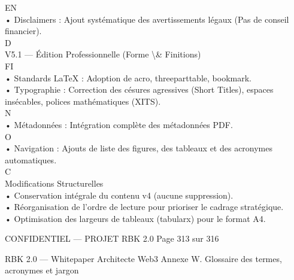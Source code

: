 \documentclass[12pt,landscape,a4paper]{article}
\newenvironment{confidential}
{\begin{tcolorbox}[
    colback=rbkred!5!white,
    colframe=rbkred!75!black,
    title=CONFIDENTIEL,
    fonttitle=\bfseries\color{white},
    coltitle=rbkred!75!black,
    breakable,
    enhanced,
    frame hidden,
    borderline west={2pt}{0pt}{rbkred!75!black}
]}
{\end{tcolorbox}}
\begin{document}
\vspace{0.5em}
\vspace{0.5em}
\vspace{0.5em}
EN\\
• Disclaimers : Ajout systématique des avertissements légaux (Pas de conseil financier).\\
\vspace{0.5em}
\vspace{0.5em}
\vspace{0.5em}
\vspace{0.5em}
D\\
V5.1 — Édition Professionnelle (Forme \textbackslash{}& Finitions)\\
\vspace{0.5em}
\vspace{0.5em}
FI\\
• Standards LaTeX : Adoption de acro, threeparttable, bookmark.\\
• Typographie : Correction des césures agressives (Short Titles), espaces insécables, polices mathématiques (XITS).\\
N\\
• Métadonnées : Intégration complète des métadonnées PDF.\\
O\\
• Navigation : Ajouts de liste des figures, des tableaux et des acronymes automatiques.\\
C\\
\vspace{0.5em}
\vspace{0.5em}
Modifications Structurelles\\
• Conservation intégrale du contenu v4 (aucune suppression).\\
• Réorganisation de l’ordre de lecture pour prioriser le cadrage stratégique.\\
• Optimisation des largeurs de tableaux (tabularx) pour le format A4.\\
\vspace{0.5em}
\vspace{0.5em}
\vspace{0.5em}
\vspace{0.5em}
\begin{confidential}CONFIDENTIEL — PROJET RBK 2.0                                            Page 313 sur 316\end{confidential}
RBK 2.0 — Whitepaper Architecte Web3                                                    Annexe W. Glossaire des termes, acronymes et jargon\\
\end{document}
